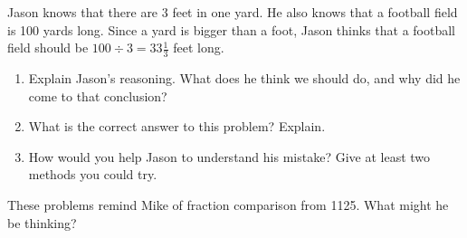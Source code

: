 \documentclass[nooutcomes,noauthor]{ximera}
\begin{document}
\begin{problem}
    Jason knows that there are 3 feet in one yard.  He also knows that a football field is 100 yards long.  Since a yard is bigger than a foot, Jason thinks that a football field should be $100 \div 3 = 33 \frac{1}{3}$ feet long.
    \begin{enumerate}
    \item Explain Jason's reasoning.  What does he think we should do, and why did he come to that conclusion?
    \item What is the correct answer to this problem? Explain.
    \item How would you help Jason to understand his mistake?  Give at least two methods you could try.
    \end{enumerate}
    
    
\end{problem} \vfill


\begin{problem}
These problems remind Mike of fraction comparison from 1125.  What might he be thinking?

\end{problem} \vfill
\end{document}
